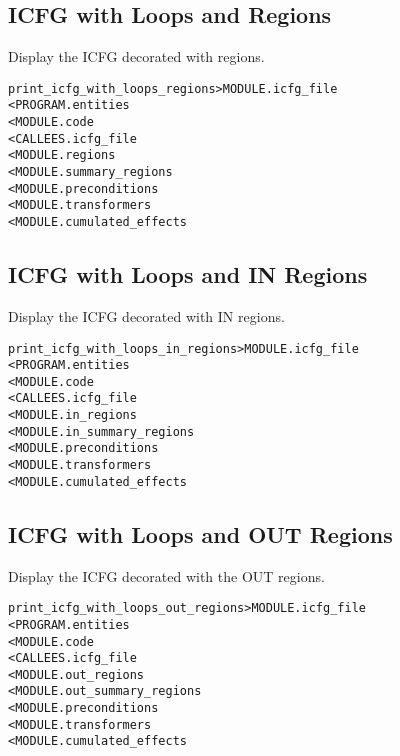 \documentclass[a4paper]{report}
\newenvironment{PipsMake}{\begin{alltt}}{\end{alltt}}
\newenvironment{PipsPass}[1]{\label{pass:#1}}{}
\begin{document}
\subsection{ICFG with Loops and Regions}

\begin{PipsPass}{print_icfg_with_loops_regions}
Display the ICFG decorated with regions.
\end{PipsPass}
\begin{PipsMake}
print_icfg_with_loops_regions            > MODULE.icfg_file
        < PROGRAM.entities
        < MODULE.code
        < CALLEES.icfg_file
        < MODULE.regions
        < MODULE.summary_regions
        < MODULE.preconditions
        < MODULE.transformers
        < MODULE.cumulated_effects
\end{PipsMake}

\subsection{ICFG with Loops and IN Regions}

\begin{PipsPass}{print_icfg_with_loops_in_regions}
Display the ICFG decorated with IN regions.
\end{PipsPass}
\begin{PipsMake}
print_icfg_with_loops_in_regions         > MODULE.icfg_file
        < PROGRAM.entities
        < MODULE.code
        < CALLEES.icfg_file
        < MODULE.in_regions
        < MODULE.in_summary_regions
        < MODULE.preconditions
        < MODULE.transformers
        < MODULE.cumulated_effects
\end{PipsMake}

\subsection{ICFG with Loops and OUT Regions}

\begin{PipsPass}{print_icfg_with_loops_out_regions}
Display the ICFG decorated with the OUT regions.
\end{PipsPass}
\begin{PipsMake}
print_icfg_with_loops_out_regions        > MODULE.icfg_file
        < PROGRAM.entities
        < MODULE.code
        < CALLEES.icfg_file
        < MODULE.out_regions
        < MODULE.out_summary_regions
        < MODULE.preconditions
        < MODULE.transformers
        < MODULE.cumulated_effects
\end{PipsMake}
\end{document}
